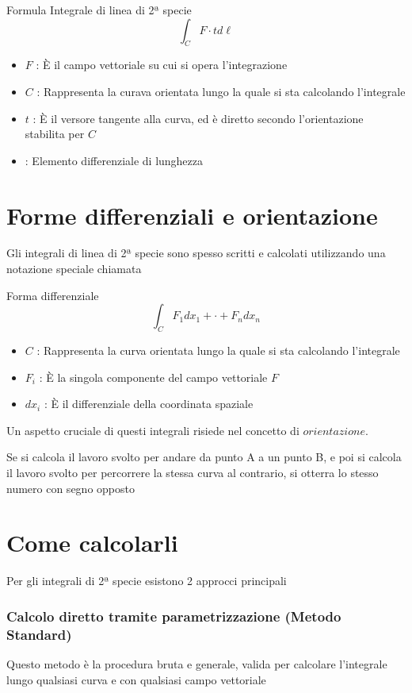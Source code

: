 \begin{definizione}{Formula Integrale di linea di 2ª specie}
    $$
        \int_{C} F \cdot t d\ell
    $$
    \begin{itemize}
        \item \textbf{$F$} : È il campo vettoriale su cui si opera l'integrazione
        \item \textbf{$C$} : Rappresenta la curava orientata lungo la quale si sta calcolando l'integrale
        \item \textbf{$t$} : È il versore tangente alla curva, ed è diretto secondo l'orientazione stabilita per $C$
        \item {} : Elemento differenziale di lunghezza
    \end{itemize}
\end{definizione}
\section{Forme differenziali e orientazione}
Gli integrali di linea di 2ª specie sono spesso scritti e calcolati utilizzando una notazione speciale chiamata
\begin{definizione}{Forma differenziale}
    $$
        \int_{C}F_{1}dx_{1}+ \cdot + F_{n}dx_{n}
    $$
    \begin{itemize}
        \item \textbf{$C$} : Rappresenta la curva orientata lungo la quale si sta calcolando l'integrale
        \item \textbf{$F_{i}$} : È la singola componente del campo vettoriale $F$
        \item \textbf{$dx_{i}$} : È il differenziale della coordinata spaziale
    \end{itemize}
\end{definizione}
Un aspetto cruciale di questi integrali risiede nel concetto di $orientazione$.

Se si calcola il lavoro svolto per andare da punto A a un punto B, e poi si calcola il lavoro svolto per percorrere la stessa curva al contrario, si otterra lo stesso numero con segno opposto
\section{Come calcolarli}
Per gli integrali di 2ª specie esistono 2 approcci principali
\subsubsection{Calcolo diretto tramite parametrizzazione (Metodo Standard)}
Questo metodo è la procedura bruta e generale, valida per calcolare l'integrale lungo qualsiasi curva e con qualsiasi campo vettoriale

